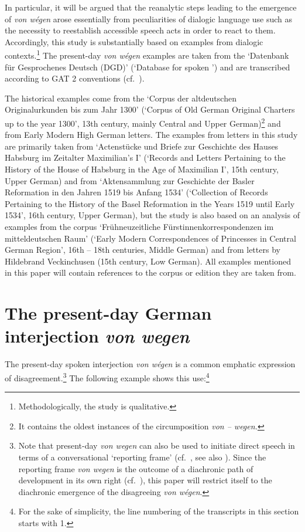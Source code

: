 \documentclass[output=paper
  ,nobabel
  ,draftmode
  ,babelshorthands
  ,colorlinks, citecolor=brown
]{langscibook}
\begin{document}
In particular, it will be argued that the reanalytic steps leading to the emergence of \emph{von wégen} arose essentially from peculiarities of dialogic language use such as the necessity to reestablish accessible speech acts in order to react to them. Accordingly, this study is substantially based on examples from dialogic contexts.\footnote{Methodologically, the study is qualitative.} The present-day \emph{von wégen} examples are taken from the `Datenbank für Gesprochenes Deutsch (DGD)' (`Database for spoken ') and are transcribed according to GAT 2 conventions (cf.\ \citealp{Selting2009}).

The historical examples come from the `Corpus der altdeutschen Originalur\-kunden bis zum Jahr 1300'
(`Corpus of Old German Original Charters up to the year 1300', 13th century, mainly
Central and Upper German)\footnote{It contains the  oldest
  instances of the circumposition \emph{von -- wegen.}}  and from Early Modern High
German letters. The examples from letters in this study are primarily
taken from `Actenstücke und Briefe zur Geschichte des Hauses Habsburg im Zeitalter Maximilian’s I'
(`Records and Letters Pertaining to the History of the House of Habsburg in the Age of
Maximilian I', 15th century, Upper German) and from `Aktensammlung zur Geschichte
der Basler Reformation in den Jahren 1519 bis Anfang 1534' (`Collection of Records Pertaining to the
History of the Basel Reformation in the Years 1519 until Early 1534', 16th century, Upper
German), but the study is also based on an analysis of examples from the corpus
`Frühneuzeitliche Fürstinnenkorrespondenzen im mitteldeutschen Raum' (`Early Modern Correspondences
of Princesses in Central German Region', 16th -- 18th centuries, Middle German) and from letters by Hildebrand Veckinchusen (15th century, Low German). All examples mentioned in this paper will contain references to the corpus or edition they are taken from.

\section{The present-day German interjection \emph{von wegen}}\label{sec-pres-vw}

The present-day spoken  interjection \emph{von wégen} is a common emphatic expression of
disagreement.\footnote{Note that present-day  \emph{von wegen} can also be used to initiate
  direct speech in terms of a conversational `reporting frame' (cf.\ \citealp{Buecker2009,
    Buecker2013}, see also \citealp[307–310]{Androutsopoulos1998}). Since the reporting frame \emph{von wegen} is the outcome of a diachronic path of development in its own right (cf.\ \citealt{Buecker2022a}), this paper will restrict itself to the diachronic emergence of the disagreeing \emph{von wégen}.} The following example shows this use:\footnote{For the sake of simplicity, the line numbering of the transcripts in this section starts with 1.}
\end{document}
